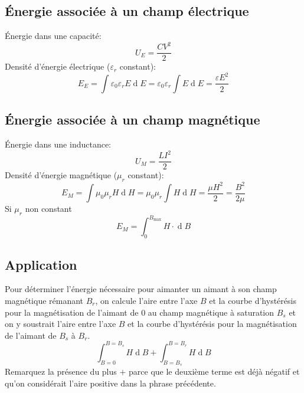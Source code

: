 \documentclass[11pt,a4paper]{article}
\DeclareMathOperator{\diff}{d}
\newcommand{\dif}{\diff\!}
\begin{document}
\subsection{Énergie associée à un champ électrique}
Énergie dans une capacité:
\[ U_E = \frac{CV^2}{2} \]
Densité d'énergie électrique ($\varepsilon_r$ constant):
\[ E_E = \int \varepsilon_0 \varepsilon_r E \dif E = \varepsilon_0 \varepsilon_r \int E \dif E = \frac{\varepsilon E^2}{2} \]
\subsection{Énergie associée à un champ magnétique}
Énergie dans une inductance:
\[ U_M = \frac{LI^2}{2} \]
Densité d'énergie magnétique ($\mu_r$ constant):
\[ E_M = \int \mu_0 \mu_r H \dif H = \mu_0 \mu_r \int H \dif H = \frac{\mu H^2}{2} = \frac{B^2}{2\mu} \]
Si $\mu_r$ non constant
\[ E_M = \int_0^{B_\mathrm{max}} H \cdot \dif B \]

\subsection{Application}
Pour déterminer l'énergie nécessaire pour aimanter un aimant à son champ magnétique rémanant $B_r$,
on calcule l'aire entre l'axe $B$ et la courbe d'hystérésis pour la magnétisation de l'aimant de 0 au champ magnétique à saturation $B_s$ et on y soustrait l'aire entre l'axe $B$ et la courbe d'hystérésis pour la magnétisation de l'aimant de $B_s$ à $B_r$.
\[ \int_{B = 0}^{B = B_s} H \dif B + \int_{B = B_s}^{B = B_r} H \dif B \]
Remarquez la présence du plus $+$ parce que le deuxième terme est déjà négatif et qu'on considérait l'aire positive dans la phrase précédente.
\end{document}
